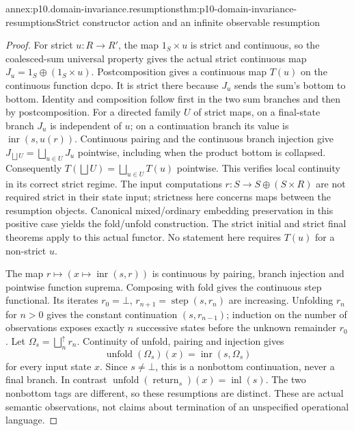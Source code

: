 \begin{annexitem}{annex:p10.domain-invariance.resumptions}{thm:p10-domain-invariance-resumptions}{Strict constructor action and an infinite observable resumption}
\begin{proof}
For strict \(u:R\to R'\), the map \(1_S\times u\) is
strict and continuous, so the coalesced-sum universal property
gives the actual strict continuous map
\(J_u=1_S\oplus(1_S\times u)\).
Postcomposition gives a continuous map \(T(u)\) on the
continuous function dcpo. It is strict there because \(J_u\)
sends the sum's bottom to bottom. Identity and composition
follow first in the two sum branches and then by postcomposition.
For a directed family \(U\) of strict maps, on a final-state
branch \(J_u\) is independent of \(u\); on a continuation
branch its value is \(\operatorname{inr}(s,u(r))\).
Continuous pairing and the continuous branch injection give
\(J_{\bigsqcup U}=\bigsqcup_{u\in U}J_u\) pointwise,
including when the product bottom is collapsed.
Consequently \(T(\bigsqcup U)=\bigsqcup_{u\in U}T(u)\)
pointwise. This verifies local continuity in its correct strict
regime. The input computations \(r:S\to S\oplus(S\times R)\)
are not required strict in their state input; strictness here
concerns maps between the resumption objects.
Canonical mixed/ordinary embedding preservation in this positive
case yields the fold/unfold construction. The strict initial
and strict final theorems apply to this actual functor. No
statement here requires \(T(u)\) for a non-strict \(u\).

The map \(r\mapsto(x\mapsto\operatorname{inr}(s,r))\)
is continuous by pairing, branch injection and pointwise function
suprema. Composing with fold gives the continuous step functional.
Its iterates \(r_0=\bot\), \(r_{n+1}=\operatorname{step}(s,r_n)\)
are increasing. Unfolding \(r_n\) for \(n>0\) gives the
constant continuation \((s,r_{n-1})\); induction on the
number of observations exposes exactly \(n\) successive
states before the unknown remainder \(r_0\).
Let \(\Omega_s=\bigsqcup_n^{\uparrow}r_n\).
Continuity of unfold, pairing and injection gives
\[
 \operatorname{unfold}(\Omega_s)(x)
                  =\operatorname{inr}(s,\Omega_s)
\]
for every input state \(x\). Since \(s\ne\bot\), this
is a nonbottom continuation, never a final branch.
In contrast \(\operatorname{unfold}(\operatorname{return}_s)(x)
=\operatorname{inl}(s)\). The two nonbottom tags are different,
so these resumptions are distinct. These are actual semantic
observations, not claims about termination of an unspecified
operational language.
\end{proof}
\end{annexitem}

